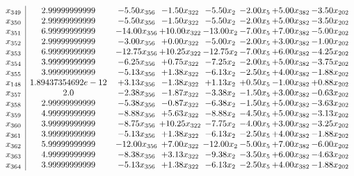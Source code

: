 \documentclass[8pt]{article}
\begin{document}
\[\begin{array}{c| c c@{\hskip 2pt} c@{\hskip 2pt} c@{\hskip 2pt} c@{\hskip 2pt} c@{\hskip 2pt} c@{\hskip 2pt} }
 x_{349}   &  2.99999999999 & -5.50 x_{356} & -1.50 x_{322} & -5.50 x_{2} & -2.00 x_{5} & +  5.00 x_{382} & -3.50 x_{202}\\
 x_{350}   &  2.99999999999 & -5.50 x_{356} & -1.50 x_{322} & -5.50 x_{2} & -2.00 x_{5} & +  5.00 x_{382} & -3.50 x_{202}\\
 x_{351}   &  6.99999999999 & -14.00 x_{356} & + 10.00 x_{322} & -13.00 x_{2} & -7.00 x_{5} & +  7.00 x_{382} & -5.00 x_{202}\\
 x_{352}   &  2.99999999999 & -3.00 x_{356} & +  0.00 x_{322} & -5.00 x_{2} & -2.00 x_{5} & +  3.00 x_{382} & -1.00 x_{202}\\
 x_{353}   &  6.99999999999 & -12.75 x_{356} & + 10.25 x_{322} & -12.75 x_{2} & -7.00 x_{5} & +  6.00 x_{382} & -4.25 x_{202}\\
 x_{354}   &  3.99999999999 & -6.25 x_{356} & +  0.75 x_{322} & -7.25 x_{2} & -2.00 x_{5} & +  5.00 x_{382} & -3.75 x_{202}\\
 x_{355}   &  3.99999999999 & -5.13 x_{356} & +  1.38 x_{322} & -6.13 x_{2} & -2.50 x_{5} & +  4.00 x_{382} & -1.88 x_{202}\\
 x_{148}   &  1.89437354692e-12 & +  3.13 x_{356} & -1.38 x_{322} & +  1.13 x_{2} & +  0.50 x_{5} & -1.00 x_{382} & +  0.88 x_{202}\\
 x_{357}   &  2.0 & -2.38 x_{356} & -1.87 x_{322} & -3.38 x_{2} & -1.50 x_{5} & +  3.00 x_{382} & -0.63 x_{202}\\
 x_{358}   &  2.99999999999 & -5.38 x_{356} & -0.87 x_{322} & -6.38 x_{2} & -1.50 x_{5} & +  5.00 x_{382} & -3.63 x_{202}\\
 x_{359}   &  4.99999999999 & -8.88 x_{356} & +  5.63 x_{322} & -8.88 x_{2} & -4.50 x_{5} & +  5.00 x_{382} & -3.13 x_{202}\\
 x_{360}   &  3.99999999999 & -8.75 x_{356} & + 10.25 x_{322} & -7.75 x_{2} & -4.00 x_{5} & +  3.00 x_{382} & -3.25 x_{202}\\
 x_{361}   &  3.99999999999 & -5.13 x_{356} & +  1.38 x_{322} & -6.13 x_{2} & -2.50 x_{5} & +  4.00 x_{382} & -1.88 x_{202}\\
 x_{362}   &  5.99999999999 & -12.00 x_{356} & +  7.00 x_{322} & -12.00 x_{2} & -5.00 x_{5} & +  7.00 x_{382} & -6.00 x_{202}\\
 x_{363}   &  4.99999999999 & -8.38 x_{356} & +  3.13 x_{322} & -9.38 x_{2} & -3.50 x_{5} & +  6.00 x_{382} & -4.63 x_{202}\\
 x_{364}   &  3.99999999999 & -5.13 x_{356} & +  1.38 x_{322} & -6.13 x_{2} & -2.50 x_{5} & +  4.00 x_{382} & -1.88 x_{202}\\

\end{array}\]
\end{document}
